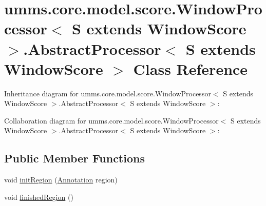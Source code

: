 \hypertarget{classumms_1_1core_1_1model_1_1score_1_1_window_processor_3_01_s_01extends_01_window_score_01_4_1ca0a3751200684ea73fe33d33dcb315e}{\section{umms.\+core.\+model.\+score.\+Window\+Processor$<$ S extends Window\+Score $>$.Abstract\+Processor$<$ S extends Window\+Score $>$ Class Reference}
\label{classumms_1_1core_1_1model_1_1score_1_1_window_processor_3_01_s_01extends_01_window_score_01_4_1ca0a3751200684ea73fe33d33dcb315e}
}


Inheritance diagram for umms.\+core.\+model.\+score.\+Window\+Processor$<$ S extends Window\+Score $>$.Abstract\+Processor$<$ S extends Window\+Score $>$\+:


Collaboration diagram for umms.\+core.\+model.\+score.\+Window\+Processor$<$ S extends Window\+Score $>$.Abstract\+Processor$<$ S extends Window\+Score $>$\+:
\subsection*{Public Member Functions}
\begin{DoxyCompactItemize}
\item 
void \hyperlink{classumms_1_1core_1_1model_1_1score_1_1_window_processor_3_01_s_01extends_01_window_score_01_4_1ca0a3751200684ea73fe33d33dcb315e_ad7991f2301d4391dd9f15996e0287514}{init\+Region} (\hyperlink{interfaceumms_1_1core_1_1annotation_1_1_annotation}{Annotation} region)
\item 
void \hyperlink{classumms_1_1core_1_1model_1_1score_1_1_window_processor_3_01_s_01extends_01_window_score_01_4_1ca0a3751200684ea73fe33d33dcb315e_a3336e14877232fca949b786283c1c5f5}{finished\+Region} ()
\end{DoxyCompactItemize}


